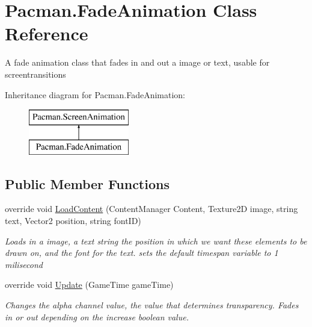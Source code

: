 \hypertarget{class_pacman_1_1_fade_animation}{\section{Pacman.\-Fade\-Animation Class Reference}
\label{class_pacman_1_1_fade_animation}
}


A fade animation class that fades in and out a image or text, usable for screentransitions  


Inheritance diagram for Pacman.\-Fade\-Animation\-:\begin{figure}[H]
\begin{center}
\leavevmode
\includegraphics[height=2.000000cm]{class_pacman_1_1_fade_animation}
\end{center}
\end{figure}
\subsection*{Public Member Functions}
\begin{DoxyCompactItemize}
\item 
override void \hyperlink{class_pacman_1_1_fade_animation_a6abddfcfb03a31152da73b6766e99a9d}{Load\-Content} (Content\-Manager Content, Texture2\-D image, string text, Vector2 position, string font\-I\-D)
\begin{DoxyCompactList}\small\item\em Loads in a image, a text string the position in which we want these elements to be drawn on, and the font for the text. sets the default timespan variable to 1 milisecond \end{DoxyCompactList}\item 
override void \hyperlink{class_pacman_1_1_fade_animation_ac6d7c4a5845a19f47dd2501271ecee7a}{Update} (Game\-Time game\-Time)
\begin{DoxyCompactList}\small\item\em Changes the alpha channel value, the value that determines transparency. Fades in or out depending on the increase boolean value. \end{DoxyCompactList}\end{DoxyCompactItemize}
